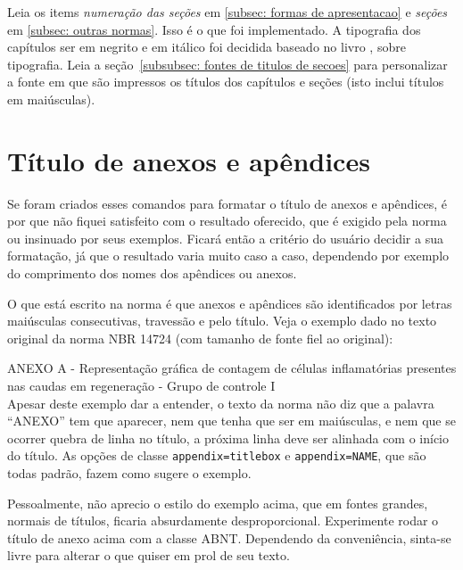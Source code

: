 \documentclass[espaco=simples,appendix=Name]{abnt}
\newcommand{\itemnorma}[1]{\textit{#1}}
\begin{document}
Leia os items \itemnorma{numeração das seções} em
\ref{subsec: formas de apresentacao} e \itemnorma{seções} em
\ref{subsec: outras normas}. Isso é o que foi implementado. A
tipografia dos capítulos ser em negrito e em itálico foi decidida baseado
no livro \cite{desktop-publishing}, sobre tipografia. Leia a
seção~\ref{subsubsec: fontes de titulos de secoes} para personalizar a
fonte em que são impressos os títulos dos capítulos e seções (isto inclui
títulos em maiúsculas).

\section{Título de anexos e apêndices}
   \label{subsec: format anexo apendice}
   
Se foram criados esses comandos para formatar o título de anexos e
apêndices, é por que não fiquei satisfeito com o resultado oferecido,
que é exigido pela norma ou insinuado por seus exemplos. Ficará então a
critério do usuário decidir a sua formatação, já que o resultado varia
muito caso a caso, dependendo por exemplo do comprimento dos nomes dos
apêndices ou anexos.

O que está escrito na norma é que anexos e apêndices são identificados por
letras maiúsculas consecutivas, travessão e pelo título. Veja o exemplo
dado no texto original da norma NBR 14724 (com tamanho de fonte fiel ao
original):

\par

\noindent ANEXO A - Representação
  gráfica de contagem de células inflamatórias presentes nas caudas em
  regeneração - Grupo de controle I\\

Apesar deste exemplo dar a entender, o texto da norma não diz que a palavra
``ANEXO'' tem que aparecer, nem que tenha que ser em maiúsculas, e nem que
se ocorrer quebra de linha no título, a próxima linha deve ser alinhada com
o início do título. As opções de classe 
\texttt{appendix=titlebox} e \texttt{appendix=NAME}, que são todas
padrão, fazem como sugere o exemplo.

Pessoalmente, não aprecio o estilo do exemplo acima, que em fontes
grandes, normais de títulos, ficaria absurdamente desproporcional.
Experimente rodar o título de anexo acima com a classe ABNT. Dependendo da
conveniência, sinta-se livre para alterar o que quiser em prol de seu texto.

\end{document}
